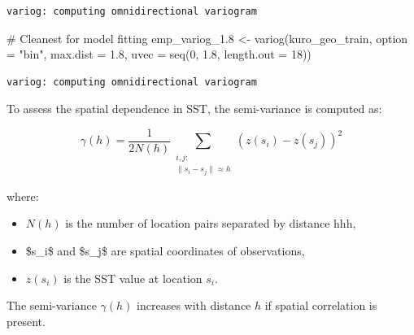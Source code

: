 \documentclass[
  11pt,
]{article}
\newenvironment{Shaded}{\begin{snugshade}}{\end{snugshade}}
\newcommand{\AttributeTok}[1]{\textcolor[rgb]{0.40,0.45,0.13}{#1}}
\newcommand{\CommentTok}[1]{\textcolor[rgb]{0.37,0.37,0.37}{#1}}
\newcommand{\DecValTok}[1]{\textcolor[rgb]{0.68,0.00,0.00}{#1}}
\newcommand{\FloatTok}[1]{\textcolor[rgb]{0.68,0.00,0.00}{#1}}
\newcommand{\FunctionTok}[1]{\textcolor[rgb]{0.28,0.35,0.67}{#1}}
\newcommand{\NormalTok}[1]{\textcolor[rgb]{0.00,0.23,0.31}{#1}}
\newcommand{\OtherTok}[1]{\textcolor[rgb]{0.00,0.23,0.31}{#1}}
\newcommand{\StringTok}[1]{\textcolor[rgb]{0.13,0.47,0.30}{#1}}
\begin{document}
\begin{verbatim}
variog: computing omnidirectional variogram
\end{verbatim}

\begin{Shaded}
\begin{Highlighting}[]
\CommentTok{\# Cleanest for model fitting}
\NormalTok{emp\_variog\_1}\FloatTok{.8} \OtherTok{\textless{}{-}} \FunctionTok{variog}\NormalTok{(kuro\_geo\_train, }\AttributeTok{option =} \StringTok{"bin"}\NormalTok{, }\AttributeTok{max.dist =} \FloatTok{1.8}\NormalTok{, }\AttributeTok{uvec =} \FunctionTok{seq}\NormalTok{(}\DecValTok{0}\NormalTok{, }\FloatTok{1.8}\NormalTok{, }\AttributeTok{length.out =} \DecValTok{18}\NormalTok{))}
\end{Highlighting}
\end{Shaded}

\begin{verbatim}
variog: computing omnidirectional variogram
\end{verbatim}

To assess the spatial dependence in SST, the semi-variance is computed
as:

\[
\gamma(h) = \frac{1}{2N(h)} \sum_{\substack{i,j: \\ \|s_i - s_j\| \approx h}} \left( z(s_i) - z(s_j) \right)^2
\]

where:

\begin{itemize}
\item
  \(N(h)\) is the number of location pairs separated by distance hhh,
\item
  \$s\_i\$\hspace{0pt} and \$s\_j\$\hspace{0pt} are spatial coordinates
  of observations,
\item
  \(z\)\((s_i)\) is the SST value at location \(s_i\)\hspace{0pt}.
\end{itemize}

The semi-variance \(\gamma(h)\) increases with distance \(h\) if spatial
correlation is present.
\end{document}
